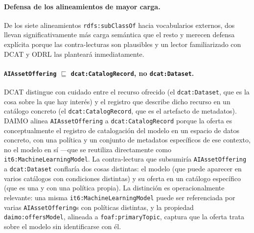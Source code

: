 \documentclass[11pt,a4paper]{article}
\newcommand{\code}[1]{\texttt{#1}}
\begin{document}
\paragraph{Defensa de los alineamientos de mayor carga.}\label{sec:alignment-defense}

De los siete alineamientos \code{rdfs:subClassOf} hacia vocabularios externos, dos llevan significativamente más carga semántica que el resto y merecen defensa explícita porque las contra-lecturas son plausibles y un lector familiarizado con DCAT y ODRL las planteará inmediatamente.

\paragraph{\code{AIAssetOffering} $\sqsubseteq$ \code{dcat:CatalogRecord}, no \code{dcat:Dataset}.} DCAT distingue con cuidado entre el recurso ofrecido (el \code{dcat:Dataset}, que es la cosa sobre la que hay interés) y el registro que describe dicho recurso en un catálogo concreto (el \code{dcat:CatalogRecord}, que es el artefacto de metadatos). DAIMO alinea \code{AIAssetOffering} a \code{dcat:CatalogRecord} porque la oferta es conceptualmente el registro de catalogación del modelo en un espacio de datos concreto, con una política y un conjunto de metadatos específicos de ese contexto, no el modelo en sí ---que se reutiliza directamente como \code{it6:MachineLearningModel}. La contra-lectura que subsumiría \code{AIAssetOffering} a \code{dcat:Dataset} conflaría dos cosas distintas: el modelo (que puede aparecer en varios catálogos con condiciones distintas) y su oferta en un catálogo específico (que es una y con una política propia). La distinción es operacionalmente relevante: una misma \code{it6:MachineLearningModel} puede ser referenciada por varias \code{AIAssetOffering}s con políticas distintas, y la propiedad \code{daimo:offersModel}, alineada a \code{foaf:primaryTopic}, captura que la oferta trata sobre el modelo sin identificarse con él.
\end{document}
